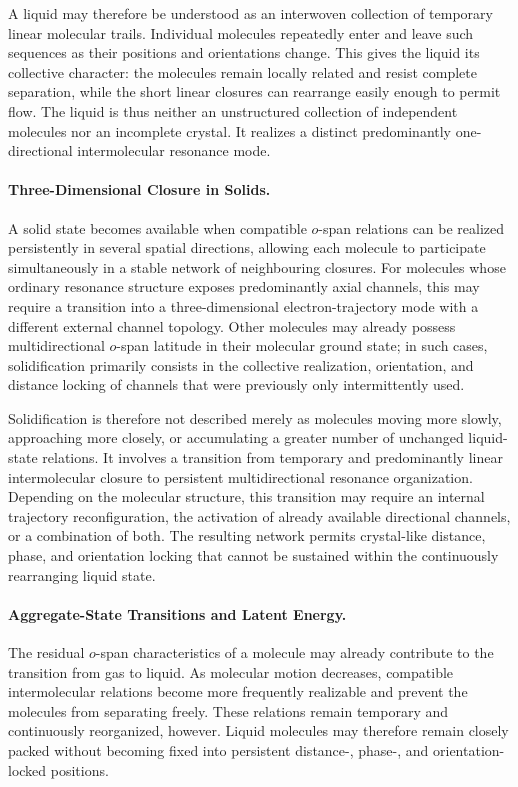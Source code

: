 \documentclass[11pt,a4paper]{article}
\begin{document}
A liquid may therefore be understood as an interwoven collection of temporary linear molecular trails. Individual molecules repeatedly enter and leave such sequences as their positions and orientations change. This gives the liquid its collective character: the molecules remain locally related and resist complete separation, while the short linear closures can rearrange easily enough to permit flow. The liquid is thus neither an unstructured collection of independent molecules nor an incomplete crystal. It realizes a distinct predominantly one-directional intermolecular resonance mode.

\paragraph{Three-Dimensional Closure in Solids.}
A solid state becomes available when compatible \(o\)-span relations can be realized persistently in several spatial directions, allowing each molecule to participate simultaneously in a stable network of neighbouring closures. For molecules whose ordinary resonance structure exposes predominantly axial channels, this may require a transition into a three-dimensional electron-trajectory mode with a different external channel topology. Other molecules may already possess multidirectional \(o\)-span latitude in their molecular ground state; in such cases, solidification primarily consists in the collective realization, orientation, and distance locking of channels that were previously only intermittently used.

Solidification is therefore not described merely as molecules moving more slowly, approaching more closely, or accumulating a greater number of unchanged liquid-state relations. It involves a transition from temporary and predominantly linear intermolecular closure to persistent multidirectional resonance organization. Depending on the molecular structure, this transition may require an internal trajectory reconfiguration, the activation of already available directional channels, or a combination of both. The resulting network permits crystal-like distance, phase, and orientation locking that cannot be sustained within the continuously rearranging liquid state.

\paragraph{Aggregate-State Transitions and Latent Energy.}
The residual \(o\)-span characteristics of a molecule may already contribute to the transition from gas to liquid. As molecular motion decreases, compatible intermolecular relations become more frequently realizable and prevent the molecules from separating freely. These relations remain temporary and continuously reorganized, however. Liquid molecules may therefore remain closely packed without becoming fixed into persistent distance-, phase-, and orientation-locked positions.
\end{document}
